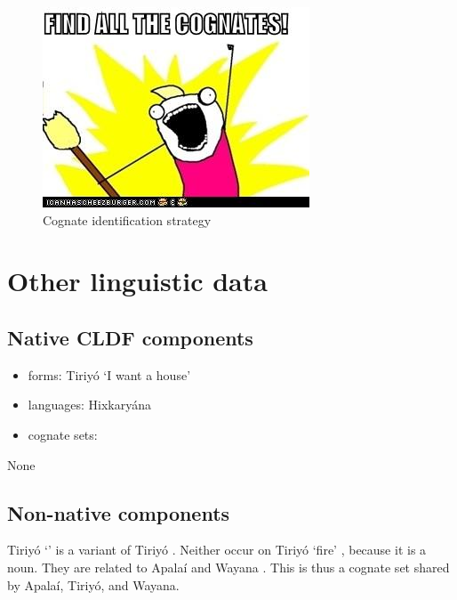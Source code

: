 \documentclass{article}
\begin{document}
\begin{figure}
\centering
\includegraphics{figures/cognates.jpg}
\caption{Cognate identification strategy\label{fig:cognates}}
\end{figure}

\section{\texorpdfstring{Other linguistic data
\label{sec:data}}{Other linguistic data }}

\subsection{\texorpdfstring{Native CLDF
components\label{native-cldf-components}}{Native CLDF components}}

\begin{itemize}
\tightlist
\item
  forms: Tiriyó  `I want a house'
  \parencites[417]{triomeira1999}
\item
  languages: Hixkaryána
\item
  cognate sets:
\end{itemize}

None

\subsection{\texorpdfstring{Non-native
components\label{non-native-components}}{Non-native components}}

Tiriyó  `' \parencites[327]{triomeira1999} is a variant
of Tiriyó  \parencites[327]{triomeira1999}. Neither occur on
Tiriyó  `fire' \parencites[314]{triomeira1999}, because it is
a noun. They are related to Apalaí 
\parencites[77]{koehn1986apalai} and Wayana 
\parencites[236]{wayanatavares2005}. This is thus a cognate set shared
by Apalaí, Tiriyó, and Wayana.
\end{document}
